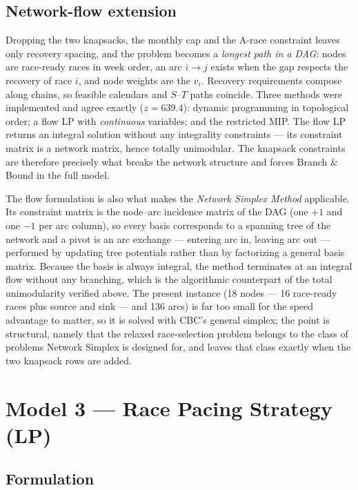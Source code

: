 \documentclass[11pt,a4paper]{article}
\begin{document}
\subsection{Network-flow extension}

Dropping the two knapsacks, the monthly cap and the A-race constraint leaves only
recovery spacing, and the problem becomes a \emph{longest path in a DAG}: nodes are
race-ready races in week order, an arc $i \to j$ exists when the gap respects the
recovery of race $i$, and node weights are the $v_i$. Recovery requirements
compose along chains, so feasible calendars and $S$--$T$ paths coincide. Three
methods were implemented and agree exactly ($z = 639.4$): dynamic programming in
topological order; a flow LP with \emph{continuous} variables; and the restricted
MIP. The flow LP returns an integral solution without any integrality constraints
--- its constraint matrix is a network matrix, hence totally unimodular. The
knapsack constraints are therefore precisely what breaks the network structure and
forces Branch \& Bound in the full model.

The flow formulation is also what makes the \emph{Network Simplex Method}
applicable. Its constraint matrix is the node--arc incidence matrix of the DAG
(one $+1$ and one $-1$ per arc column), so every basis corresponds to a
spanning tree of the network and a pivot is an arc exchange --- entering arc in,
leaving arc out --- performed by updating tree potentials rather than by
factorizing a general basis matrix. Because the basis is always integral, the
method terminates at an integral flow without any branching, which is the
algorithmic counterpart of the total unimodularity verified above. The present
instance (18 nodes --- 16 race-ready races plus source and sink --- and 136
arcs) is far too small for the speed advantage to
matter, so it is solved with CBC's general simplex; the point is structural,
namely that the relaxed race-selection problem belongs to the class of problems
Network Simplex is designed for, and leaves that class exactly when the two
knapsack rows are added.

\section{Model 3 --- Race Pacing Strategy (LP)}

\subsection{Formulation}
\end{document}
